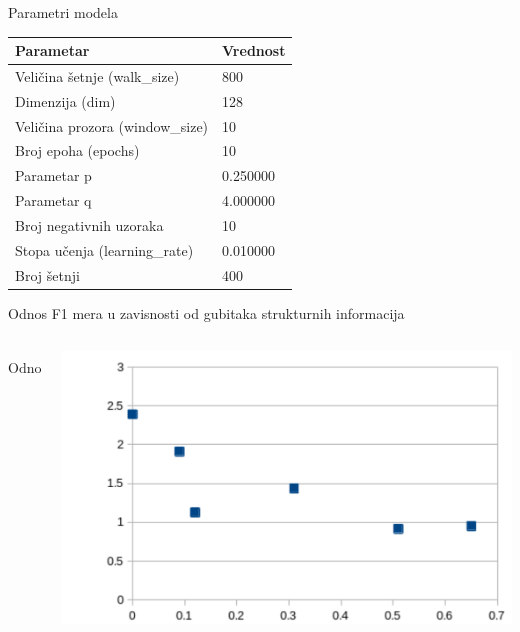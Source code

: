 \documentclass{beamer}
\begin{document}
\begin{frame}{Parametri modela}
    \centering
    \begin{table}
        \label{tab:4.12}
        \begin{tabular}{p{2.5in}p{1in}}
        \hline
        Parametar & Vrednost \\
        \hline
        Veličina šetnje (walk\_size) & 800 \\
        Dimenzija (dim) & 128 \\
        Veličina prozora (window\_size) & 10 \\
        Broj epoha (epochs) & 10 \\
        Parametar p & 0.250000 \\
        Parametar q & 4.000000 \\
        Broj negativnih uzoraka & 10 \\
        Stopa učenja (learning\_rate) & 0.010000 \\
        Broj šetnji & 400 \\
        \hline
    \end{tabular}
\end{table}
\end{frame}


\begin{frame}{Odnos F1 mera u zavisnosti od gubitaka strukturnih informacija}
    \begin{columns}
        \begin{column}{0.2\textwidth}
            $$ \text{Odnos} = \frac{F_1^p}{F_1^s} $$ 
        \end{column}
        \begin{column}{0.8\textwidth}
            \includegraphics[height=0.6\textheight]{png/grafik.png}
        \end{column}
    \end{columns}
\end{frame}
\end{document}
